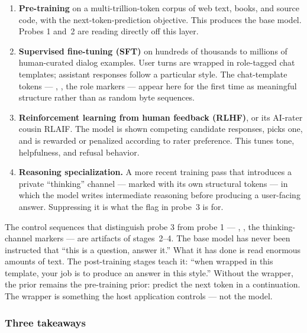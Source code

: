 \begin{enumerate}[leftmargin=1.5em,itemsep=0.2em]
\item \textbf{Pre-training} on a multi-trillion-token corpus of
  web text, books, and source code, with the next-token-prediction
  objective. This produces the base model. Probes 1 and~2 are
  reading directly off this layer.
\item \textbf{Supervised fine-tuning (SFT)} on hundreds of
  thousands to millions of human-curated dialog examples. User
  turns are wrapped in role-tagged chat templates; assistant
  responses follow a particular style. The chat-template tokens
  --- , , the role
  markers --- appear here for the first time as meaningful
  structure rather than as random byte sequences.
\item \textbf{Reinforcement learning from human feedback (RLHF)},
  or its AI-rater cousin RLAIF. The model is shown competing
  candidate responses, picks one, and is rewarded or penalized
  according to rater preference. This tunes tone, helpfulness,
  and refusal behavior.
\item \textbf{Reasoning specialization.} A more recent training
  pass that introduces a private ``thinking'' channel --- marked
  with its own structural tokens --- in which the model writes
  intermediate reasoning before producing a user-facing answer.
  Suppressing it is what the  flag in probe~3
  is for.
\end{enumerate}

\noindent
The control sequences that distinguish probe 3 from probe 1 ---
, , the
thinking-channel markers --- are artifacts of stages~2--4. The
base model has never been instructed that ``this is a question,
answer it.'' What it has done is read enormous amounts of text.
The post-training stages teach it: ``when wrapped in this
template, your job is to produce an answer in this style.''
Without the wrapper, the prior remains the pre-training prior:
predict the next token in a continuation. The wrapper is
something the host application controls --- not the model.

\subsubsection*{Three takeaways}

